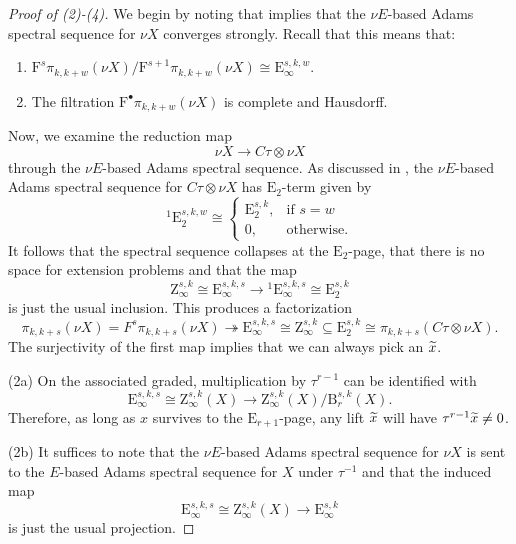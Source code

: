 \begin{proof}[Proof of (2)-(4)]
    We begin by noting that  implies that the $\nu E$-based Adams spectral sequence for $\nu X$ converges strongly.
    Recall that this means that:

    \begin{enumerate}
    \item $\mathrm{F}^s \pi_{k,k+w}( \nu X )/ \mathrm{F}^{s+1} \pi_{k,k+w}( \nu X ) \cong \mathrm{E}^{s,k,w} _\infty$.
    \item The filtration $\mathrm{F}^{\bullet} \pi_{k,k+w}( \nu X )$ is complete and Hausdorff.
    \end{enumerate}

    Now, we examine the reduction map
    $$ \nu X \to C\tau \otimes \nu X $$
    through the $\nu E$-based Adams spectral sequence.
    As discussed in , the $\nu E$-based Adams spectral sequence for $C\tau \otimes \nu X$ has $\mathrm{E}_2$-term given by
    $$ {}^1\mathrm{E}_2^{s,k,w} \cong \begin{cases} \mathrm{E}^{s,k}_{2}, & \text{if } s=w \\ 0, & \text{otherwise.} \end{cases} $$
    It follows that the spectral sequence collapses at the $\mathrm{E}_2$-page, that there is no space for extension problems and that the map
    $$ \mathrm{Z}_\infty^{s,k} \cong \mathrm{E}_\infty^{s,k,s} \to {}^1\mathrm{E}_\infty^{s,k,s} \cong \mathrm{E}_2^{s,k} $$
    is just the usual inclusion. This produces a factorization
    $$\pi_{k,k+s}(\nu X)=F^{s} \pi_{k,k+s}(\nu X) \twoheadrightarrow \mathrm{E}_\infty^{s,k,s} \cong \mathrm{Z}_\infty^{s,k} \subseteq \mathrm{E}_2^{s,k} \cong \pi_{k,k+s}(C\tau \otimes \nu X). $$
    The surjectivity of the first map implies that we can always pick an $\wt{x}$.

    (2a) On the associated graded, multiplication by $\tau^{r-1}$ can be identified with
    $$ \mathrm{E}_\infty^{s,k,s} \cong \mathrm{Z}_\infty^{s,k}(X) \to \mathrm{Z}_\infty^{s,k}(X) / \mathrm{B}_{r}^{s,k}(X). $$
    Therefore, as long as $x$ survives to the $\mathrm{E}_{r+1}$-page, any lift $\wt{x}$ will have $\tau^{r-1}\wt{x} \neq 0$.
    
    (2b) It suffices to note that the $\nu E$-based Adams spectral sequence for $\nu X$ is sent to the $E$-based Adams spectral sequence for $X$ under $\tau^{-1}$ and that the induced map
    $$ \mathrm{E}_\infty^{s,k,s} \cong \mathrm{Z}_\infty^{s,k}(X) \to \mathrm{E}_\infty^{s,k} $$
    is just the usual projection.


\end{proof}
